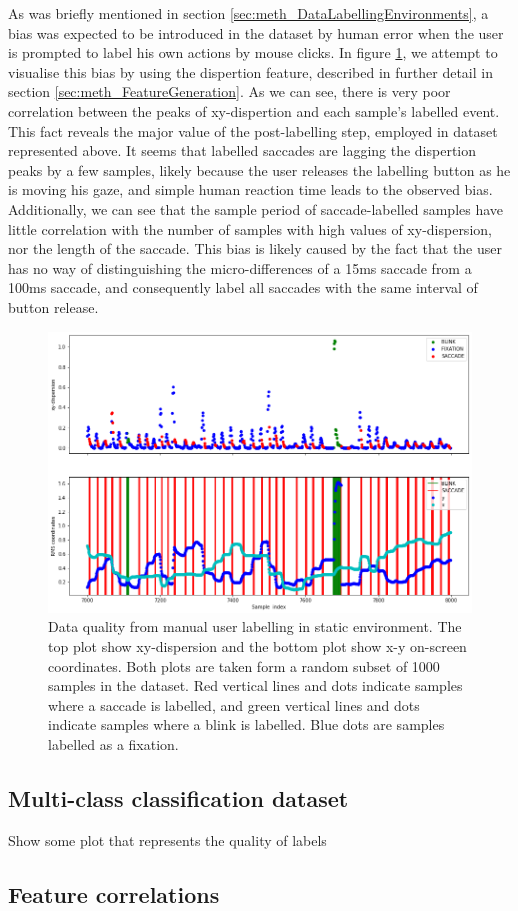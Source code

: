 As was briefly mentioned in section \ref{sec:meth_DataLabellingEnvironments}, a bias was expected to be introduced in the dataset by human error when the user is prompted to label his own actions by mouse clicks. In figure \ref{fig:res_HumanErrorBias}, we attempt to visualise this bias by using the dispertion feature, described in further detail in section \ref{sec:meth_FeatureGeneration}. As we can see, there is very poor correlation between the peaks of xy-dispertion and each sample's labelled event. This fact reveals the major value of the post-labelling step, employed in dataset represented above. It seems that labelled saccades are lagging the dispertion peaks by a few samples, likely because the user releases the labelling button as he is moving his gaze, and simple human reaction time leads to the observed bias. Additionally, we can see that the sample period of saccade-labelled samples have little correlation with the number of samples with high values of xy-dispersion, nor the length of the saccade. This bias is likely caused by the fact that the user has no way of distinguishing the micro-differences of a 15ms saccade from a 100ms saccade, and consequently label all saccades with the same interval of button release. 

\begin{figure}[h]
    \centering
    \includegraphics[width=\textwidth]{Images/Dataset/DQ_V1.png}
    \caption{Data quality from manual user labelling in static environment. The top plot show xy-dispersion and the bottom plot show x-y on-screen coordinates. Both plots are taken form a random subset of 1000 samples in the dataset. Red vertical lines and dots indicate samples where a saccade is labelled, and green vertical lines and dots indicate samples where a blink is labelled. Blue dots are samples labelled as a fixation.}
    \label{fig:res_HumanErrorBias}
\end{figure}


\subsection{Multi-class classification dataset}

Show some plot that represents the quality of labels

\subsection{Feature correlations}